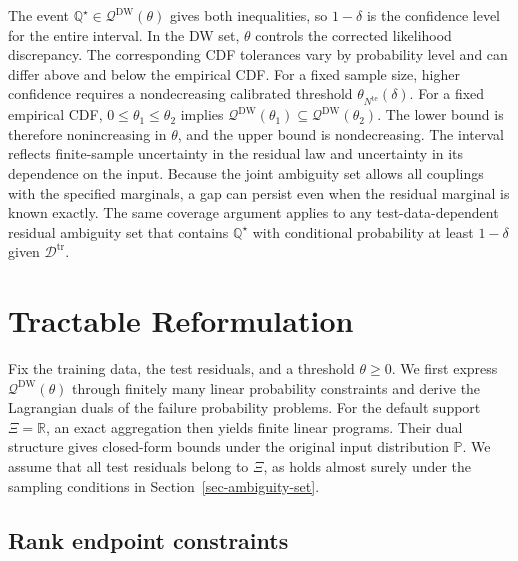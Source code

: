 \documentclass[review,11pt,3p,authoryear,nopreprintline]{elsarticle}
\begin{document}
The event $\mathbb Q^\star\in\mathscr Q^{\mathrm{DW}}(\theta)$ gives both inequalities, so $1-\delta$ is the confidence level for the entire interval. In the DW set, $\theta$ controls the corrected likelihood discrepancy. The corresponding CDF tolerances vary by probability level and can differ above and below the empirical CDF. For a fixed sample size, higher confidence requires a nondecreasing calibrated threshold $\theta_{N^{\mathrm{te}}}(\delta)$. For a fixed empirical CDF, $0\le\theta_1\le\theta_2$ implies $\mathscr Q^{\mathrm{DW}}(\theta_1)\subseteq\mathscr Q^{\mathrm{DW}}(\theta_2)$. The lower bound is therefore nonincreasing in $\theta$, and the upper bound is nondecreasing. The interval reflects finite-sample uncertainty in the residual law and uncertainty in its dependence on the input. Because the joint ambiguity set allows all couplings with the specified marginals, a gap can persist even when the residual marginal is known exactly. The same coverage argument applies to any test-data-dependent residual ambiguity set that contains $\mathbb Q^\star$ with conditional probability at least $1-\delta$ given $\mathcal D^{\mathrm{tr}}$.

\section{Tractable Reformulation}
\label{sec-reformulation}

Fix the training data, the test residuals, and a threshold $\theta\ge0$. We first express $\mathscr Q^{\mathrm{DW}}(\theta)$ through finitely many linear probability constraints and derive the Lagrangian duals of the failure probability problems. For the default support $\Xi=\mathbb R$, an exact aggregation then yields finite linear programs. Their dual structure gives closed-form bounds under the original input distribution $\mathbb P$. We assume that all test residuals belong to $\Xi$, as holds almost surely under the sampling conditions in Section~\ref{sec-ambiguity-set}.

\subsection{Rank endpoint constraints}
\label{subsec-rank-constraints}
\end{document}
